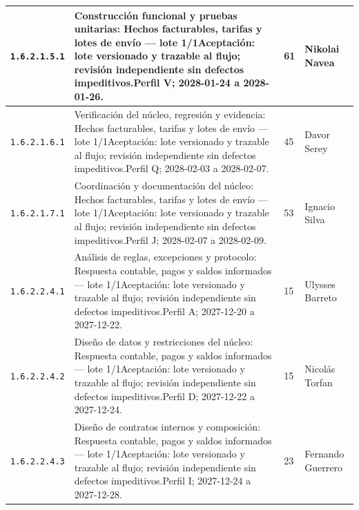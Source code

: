 \begin{longtable}{L{29mm}L{80mm}R{12mm}L{28mm}}
\texttt{1.\allowbreak{}6.\allowbreak{}2.\allowbreak{}1.\allowbreak{}5.\allowbreak{}1} & Construcción funcional y pruebas unitarias: Hechos facturables, tarifas y lotes de envío — lote 1/1\newline Aceptación: lote versionado y trazable al flujo; revisión independiente sin defectos impeditivos.\newline Perfil V; 2028-01-24 a 2028-01-26. & 61 & Nikolai Navea\\\hline
\texttt{1.\allowbreak{}6.\allowbreak{}2.\allowbreak{}1.\allowbreak{}6.\allowbreak{}1} & Verificación del núcleo, regresión y evidencia: Hechos facturables, tarifas y lotes de envío — lote 1/1\newline Aceptación: lote versionado y trazable al flujo; revisión independiente sin defectos impeditivos.\newline Perfil Q; 2028-02-03 a 2028-02-07. & 45 & Davor Serey\\\hline
\texttt{1.\allowbreak{}6.\allowbreak{}2.\allowbreak{}1.\allowbreak{}7.\allowbreak{}1} & Coordinación y documentación del núcleo: Hechos facturables, tarifas y lotes de envío — lote 1/1\newline Aceptación: lote versionado y trazable al flujo; revisión independiente sin defectos impeditivos.\newline Perfil J; 2028-02-07 a 2028-02-09. & 53 & Ignacio Silva\\\hline
\texttt{1.\allowbreak{}6.\allowbreak{}2.\allowbreak{}2.\allowbreak{}4.\allowbreak{}1} & Análisis de reglas, excepciones y protocolo: Respuesta contable, pagos y saldos informados — lote 1/1\newline Aceptación: lote versionado y trazable al flujo; revisión independiente sin defectos impeditivos.\newline Perfil A; 2027-12-20 a 2027-12-22. & 15 & Ulysses Barreto\\\hline
\texttt{1.\allowbreak{}6.\allowbreak{}2.\allowbreak{}2.\allowbreak{}4.\allowbreak{}2} & Diseño de datos y restricciones del núcleo: Respuesta contable, pagos y saldos informados — lote 1/1\newline Aceptación: lote versionado y trazable al flujo; revisión independiente sin defectos impeditivos.\newline Perfil D; 2027-12-22 a 2027-12-24. & 15 & Nicolás Torfan\\\hline
\texttt{1.\allowbreak{}6.\allowbreak{}2.\allowbreak{}2.\allowbreak{}4.\allowbreak{}3} & Diseño de contratos internos y composición: Respuesta contable, pagos y saldos informados — lote 1/1\newline Aceptación: lote versionado y trazable al flujo; revisión independiente sin defectos impeditivos.\newline Perfil I; 2027-12-24 a 2027-12-28. & 23 & Fernando Guerrero\\\hline

\end{longtable}
